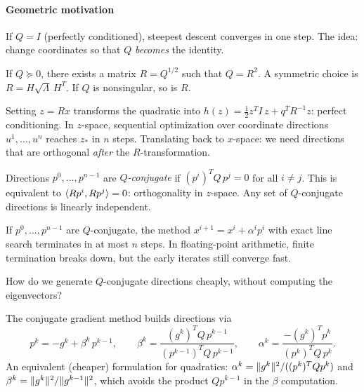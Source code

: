 \paragraph{Geometric motivation}

If $Q = I$ (perfectly conditioned), steepest descent converges in one step.
The idea: change coordinates so that $Q$ \emph{becomes} the identity.

\begin{thm}\label{thm:sqrt-decomp}
	If $Q \succeq 0$, there exists a matrix $R = Q^{1/2}$ such that $Q = R^2$.
	A symmetric choice is $R = H \sqrt{\Lambda}\, H^T$.
	If $Q$ is nonsingular, so is $R$.
\end{thm}

Setting $z = Rx$ transforms the quadratic into $h(z) = \frac{1}{2} z^T I\, z + q^T R^{-1} z$: perfect conditioning.
In $z$-space, sequential optimization over coordinate directions $u^1, \dots, u^n$ reaches $z_*$ in $n$ steps.
Translating back to $x$-space: we need directions that are orthogonal \textit{after} the $R$-transformation.

\begin{defn}\label{def:q-conjugate}
	Directions $p^0, \dots, p^{n-1}$ are \textit{$Q$-conjugate} if $(p^i)^T Q\, p^j = 0$ for all $i \neq j$.
	This is equivalent to $\langle Rp^i, Rp^j\rangle = 0$: orthogonality in $z$-space.
	Any set of $Q$-conjugate directions is linearly independent.
\end{defn}

\begin{thm}\label{thm:cg-finite}
	If $p^0, \dots, p^{n-1}$ are $Q$-conjugate, the method $x^{i+1} = x^i + \alpha^i p^i$ with exact line search terminates in at most $n$ steps.
	In floating-point arithmetic, finite termination breaks down, but the early iterates still converge fast.
\end{thm}

How do we generate $Q$-conjugate directions cheaply, without computing the eigenvectors?

\begin{defn}\label{def:fletcher-reeves}
	The conjugate gradient method builds directions via
	\begin{equation}\label{eq:fletcher-reeves}
		p^k = -g^k + \beta^k\, p^{k-1},
		\qquad
		\beta^k = \frac{(g^k)^T Q\, p^{k-1}}{(p^{k-1})^T Q\, p^{k-1}},
		\qquad
		\alpha^k = \frac{-(g^k)^T p^k}{(p^k)^T Q\, p^k}.
	\end{equation}
	An equivalent (cheaper) formulation for quadratics:
	$\alpha^k = \lVert g^k\rVert^2 / ((p^k)^T Q p^k)$ and $\beta^k = \lVert g^k\rVert^2 / \lVert g^{k-1}\rVert^2$,
	which avoids the product $Q p^{k-1}$ in the $\beta$ computation.
\end{defn}

